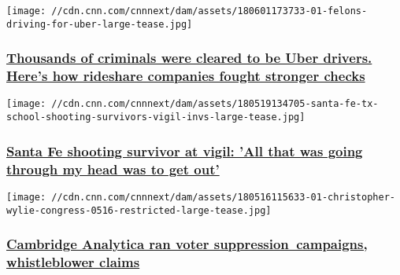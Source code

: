 \texttt{[image: //cdn.cnn.com/cnnnext/dam/assets/180601173733-01-felons-driving-for-uber-large-tease.jpg]}

\hypertarget{thousands-of-criminals-were-cleared-to-be-uber-drivers-heres-how-rideshare-companies-fought-stronger-checks-1}{%
\subsubsection{\texorpdfstring{\href{/2018/06/01/us/felons-driving-for-uber-invs/index.html}{Thousands
of criminals were cleared to be Uber drivers. Here's how rideshare
companies fought stronger
checks}}{Thousands of criminals were cleared to be Uber drivers. Here's how rideshare companies fought stronger checks}}\label{thousands-of-criminals-were-cleared-to-be-uber-drivers-heres-how-rideshare-companies-fought-stronger-checks-1}}

\href{/2018/05/19/us/santa-fe-tx-school-shooting-survivors-at-vigil-invs/index.html}{}

\texttt{[image: //cdn.cnn.com/cnnnext/dam/assets/180519134705-santa-fe-tx-school-shooting-survivors-vigil-invs-large-tease.jpg]}

\hypertarget{santa-fe-shooting-survivor-at-vigil-all-that-was-going-through-my-head-was-to-get-out}{%
\subsubsection{\texorpdfstring{\href{/2018/05/19/us/santa-fe-tx-school-shooting-survivors-at-vigil-invs/index.html}{Santa
Fe shooting survivor at vigil: 'All that was going through my head was
to get
out'}}{Santa Fe shooting survivor at vigil: 'All that was going through my head was to get out'}}\label{santa-fe-shooting-survivor-at-vigil-all-that-was-going-through-my-head-was-to-get-out}}

\href{/2018/05/16/politics/cambridge-analytica-congress-wylie/index.html}{}

\texttt{[image: //cdn.cnn.com/cnnnext/dam/assets/180516115633-01-christopher-wylie-congress-0516-restricted-large-tease.jpg]}

\hypertarget{cambridge-analytica-ran-voter-suppression-campaigns-whistleblower-claims}{%
\subsubsection{\texorpdfstring{\href{/2018/05/16/politics/cambridge-analytica-congress-wylie/index.html}{Cambridge
Analytica ran voter suppression~campaigns, whistleblower
claims}}{Cambridge Analytica ran voter suppression~campaigns, whistleblower claims}}\label{cambridge-analytica-ran-voter-suppression-campaigns-whistleblower-claims}}


